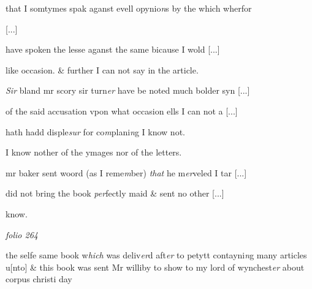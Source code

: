 \documentclass[12pt, a4paper]{book}
\begin{document}
that I somtymes spak aganst evell opynio\textit{n}s by the which wherfor
			
               
				[...]
			
have spoken the lesse aganst the same bicause I wold 
				[...]
			
like occasion. \& further I can not say in the article.

				\marginpar[\vspace{0.5cm}{\textcolor{Gray}{11}}]{}
			

		\ifthenelse{\isodd{\thepage}}
		{\reversemarginpar}
		{\normalmarginpar}
		\textit{Sir} bland mr scory sir turn\textit{er} have be noted much bolder syn
				[...]
			
of the said accusation vpon what occasion ells 
			I can not a
				[...]
			
               hath hadd disple\textit{sur} for co\textit{m}plani\textit{n}g I know not. 
			

				\marginpar[\vspace{0.5cm}{\textcolor{Gray}{12}}]{}
			

		\ifthenelse{\isodd{\thepage}}
		{\reversemarginpar}
		{\normalmarginpar}
		I know nother of the ymages nor of the letters.

				\marginpar[\vspace{0.5cm}{\textcolor{Gray}{13}}]{}
			

		\ifthenelse{\isodd{\thepage}}
		{\reversemarginpar}
		{\normalmarginpar}
		mr baker sent woord (as I reme\textit{m}ber) \textit{that} he m\textit{er}veled I tar
				[...]
			
did not bring the book \textit{per}fectly maid \& sent no other 
				[...]
			
know.

\dotfill
						\newpage
{}

\textit{folio 264}



				\marginpar[\vspace{0.5cm}{\textcolor{Gray}{14}}]{}
			

		\ifthenelse{\isodd{\thepage}}
		{\reversemarginpar}
		{\normalmarginpar}
		the selfe same book w\textit{hich} was deliv\textit{er}d aft\textit{er} to petytt contayni\textit{n}g many articles u[nto]
\& this book was sent Mr williby to show to my lord of wynchest\textit{er} about corpus
christi day 
\end{document}
